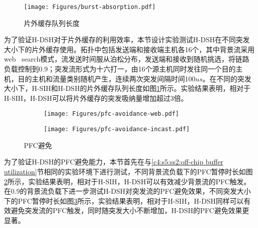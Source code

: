 

\label{c4:s5:ss2:off-chip buffer utilization}

\begin{figure}[H]
  \centering
  \texttt{[image: Figures/burst-absorption.pdf]}
  \caption{片外缓存队列长度}
  \label{c4:s1:ss1:fig:burst absorption}
\end{figure}

为了验证H-DSH对于片外缓存的利用效率，本节设计实验测试H-DSH在不同突发大小下的片外缓存使用。拓扑中包括发送端和接收端主机各16个，其中背景流采用web \ search\cite{SIGCOMM10DCTCP}模式，流发送时间服从泊松分布，发送端和接收到随机挑选，将链路负载控制到0.9；突发流形式为十六打一，由16个源主机同时发往同一个目的主机，目的主机和流量类别随机产生，连续两次突发间隔时间100$us$。在不同的突发大小下，H-SIH和H-DSH的片外缓存队列长度如图\ref{c4:s1:ss1:fig:burst absorption}所示。实验结果表明，相对于H-SIH，H-DSH可以将片外缓存的突发吸纳量增加超过3倍。

\label{c4:s5:ss2:pfc avoidance hdsh}

\begin{figure}[H]
  \begin{subfigure}[b]{0.49\linewidth}
      \centering
      \texttt{[image: Figures/pfc-avoidance-web.pdf]}
      \label{c3:s3:ss4:fig:sub1:web flow pfc avoidance}
  \end{subfigure}
  \begin{subfigure}[b]{0.49\linewidth}
      \centering
      \texttt{[image: Figures/pfc-avoidance-incast.pdf]}
      \label{c3:s3:ss4:fig:sub1:incast flow pfc avoidance}
  \end{subfigure}
  \caption{PFC避免}
  \label{c3:s3:ss4:fig:hdsh pfc avoidance}
\end{figure}

为了验证H-DSH的PFC避免能力，本节首先在与\ref{c4:s5:ss2:off-chip buffer utilization}节相同的实验环境下进行测试，不同背景流负载下的PFC暂停时长如图\ref{c3:s3:ss4:fig:sub1:web flow pfc avoidance}所示，实验结果表明，相对于H-SIH，H-DSH可以有效减少背景流的PFC触发。在0.9的背景流负载下进一步测试H-DSH对突发流的PFC避免效果，不同突发大小下的PFC暂停时长如图\ref{c3:s3:ss4:fig:sub1:incast flow pfc avoidance}所示，实验结果表明，相对于H-SIH，H-DSH同样可以有效避免突发流的PFC触发，同时随突发大小不断增加，H-DSH的PFC避免效果更显著。

